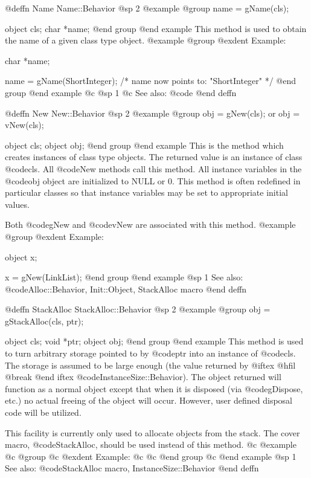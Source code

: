 @deffn {Name} Name::Behavior
@sp 2
@example
@group
name = gName(cls);

object  cls;
char    *name;
@end group
@end example
This method is used to obtain the name of a given class type object.
@example
@group
@exdent Example:

char    *name;

name = gName(ShortInteger);
/*  name now points to:   "ShortInteger"  */
@end group
@end example
@c @sp 1
@c See also:  @code{}
@end deffn







@deffn {New} New::Behavior
@sp 2
@example
@group
obj = gNew(cls);
     or
obj = vNew(cls);

object  cls;
object  obj;
@end group
@end example
This is the method which creates instances of class type objects.  The
returned value is an instance of class @code{cls}.  All @code{New}
methods call this method.  All instance variables in the @code{obj}
object are initialized to NULL or 0.  This method is often redefined in
particular classes so that instance variables may be set to appropriate
initial values.

Both @code{gNew} and @code{vNew} are associated with this method.
@example
@group
@exdent Example:

object  x;

x = gNew(LinkList);
@end group
@end example
@sp 1
See also:  @code{Alloc::Behavior, Init::Object, StackAlloc macro}
@end deffn












@deffn {StackAlloc} StackAlloc::Behavior
@sp 2
@example
@group
obj = gStackAlloc(cls, ptr);

object  cls;
void    *ptr;
object  obj;
@end group
@end example
This method is used to turn arbitrary storage pointed to by @code{ptr}
into an instance of @code{cls}.  The storage is assumed to be large
enough (the value returned by 
@iftex
@hfil @break 
@end iftex
@code{InstanceSize::Behavior}).
The object returned will function as a normal object except that when it
is disposed (via @code{gDispose}, etc.) no actual freeing of the object
will occur.  However, user defined disposal code will be utilized.

This facility is currently only used to allocate objects from the
stack.  The cover macro, @code{StackAlloc}, should be used instead
of this method.
@c @example
@c @group
@c @exdent Example:
@c 
@c @end group
@c @end example
@sp 1
See also:  @code{StackAlloc macro, InstanceSize::Behavior}
@end deffn













